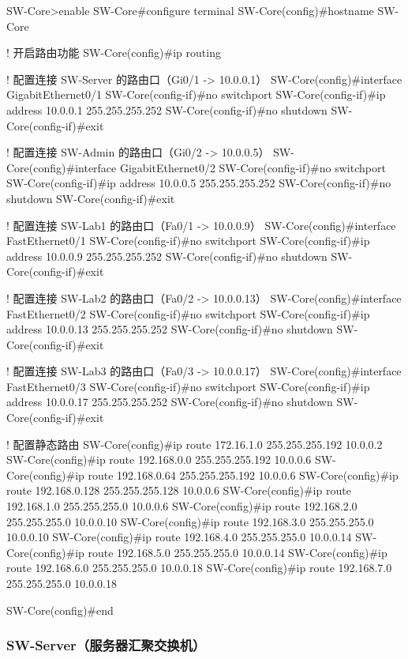 \documentclass[12pt,a4paper]{ctexart}
\begin{document}
\begin{codeblock}
SW-Core>enable
SW-Core#configure terminal
SW-Core(config)#hostname SW-Core

! 开启路由功能
SW-Core(config)#ip routing

! 配置连接 SW-Server 的路由口（Gi0/1 -> 10.0.0.1）
SW-Core(config)#interface GigabitEthernet0/1
SW-Core(config-if)#no switchport
SW-Core(config-if)#ip address 10.0.0.1 255.255.255.252
SW-Core(config-if)#no shutdown
SW-Core(config-if)#exit

! 配置连接 SW-Admin 的路由口（Gi0/2 -> 10.0.0.5）
SW-Core(config)#interface GigabitEthernet0/2
SW-Core(config-if)#no switchport
SW-Core(config-if)#ip address 10.0.0.5 255.255.255.252
SW-Core(config-if)#no shutdown
SW-Core(config-if)#exit

! 配置连接 SW-Lab1 的路由口（Fa0/1 -> 10.0.0.9）
SW-Core(config)#interface FastEthernet0/1
SW-Core(config-if)#no switchport
SW-Core(config-if)#ip address 10.0.0.9 255.255.255.252
SW-Core(config-if)#no shutdown
SW-Core(config-if)#exit

! 配置连接 SW-Lab2 的路由口（Fa0/2 -> 10.0.0.13）
SW-Core(config)#interface FastEthernet0/2
SW-Core(config-if)#no switchport
SW-Core(config-if)#ip address 10.0.0.13 255.255.255.252
SW-Core(config-if)#no shutdown
SW-Core(config-if)#exit

! 配置连接 SW-Lab3 的路由口（Fa0/3 -> 10.0.0.17）
SW-Core(config)#interface FastEthernet0/3
SW-Core(config-if)#no switchport
SW-Core(config-if)#ip address 10.0.0.17 255.255.255.252
SW-Core(config-if)#no shutdown
SW-Core(config-if)#exit

! 配置静态路由
SW-Core(config)#ip route 172.16.1.0 255.255.255.192 10.0.0.2
SW-Core(config)#ip route 192.168.0.0 255.255.255.192 10.0.0.6
SW-Core(config)#ip route 192.168.0.64 255.255.255.192 10.0.0.6
SW-Core(config)#ip route 192.168.0.128 255.255.255.128 10.0.0.6
SW-Core(config)#ip route 192.168.1.0 255.255.255.0 10.0.0.6
SW-Core(config)#ip route 192.168.2.0 255.255.255.0 10.0.0.10
SW-Core(config)#ip route 192.168.3.0 255.255.255.0 10.0.0.10
SW-Core(config)#ip route 192.168.4.0 255.255.255.0 10.0.0.14
SW-Core(config)#ip route 192.168.5.0 255.255.255.0 10.0.0.14
SW-Core(config)#ip route 192.168.6.0 255.255.255.0 10.0.0.18
SW-Core(config)#ip route 192.168.7.0 255.255.255.0 10.0.0.18

SW-Core(config)#end
\end{codeblock}

\subsubsection{SW-Server（服务器汇聚交换机）}
\end{document}
